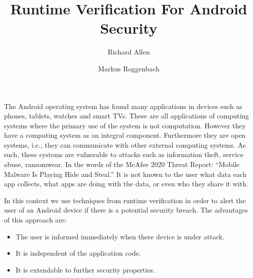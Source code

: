 \documentclass[runningheads]{llncs}
\begin{document}
%
\title{Runtime Verification For Android Security}
%
%
\author{Richard Allen \and
Markus Roggenbach}
%
%
%
\maketitle              %
%
%
%
%
%
%
%

The Android operating system has found many applications in devices such as phones, tablets, watches and smart TVs.  These are all applications of computing systems where the primary use of the system is not computation.  However they have a computing system as an integral component.  Furthermore they are open systems, i.e., they can communicate with other external computing systems.  As such, these systems are vulnerable to attacks such as information theft, service abuse, ransomwear.  In the words of the McAfee 2020 Threat Report:  ``Mobile Malware Is Playing Hide and Steal.''  It is not known to the user what data each app collects, what apps are doing with the data, or even who they share it with.

In this context we use techniques from runtime verification in order to alert the user of an Android device if there is a potential security breach.  The advantages of this approach are:
\begin{itemize}
\item The user is informed immediately when there device is under attack.
\item It is independent of the application code.  %
\item It is extendable to further security properties.
\end{itemize}
\end{document}
